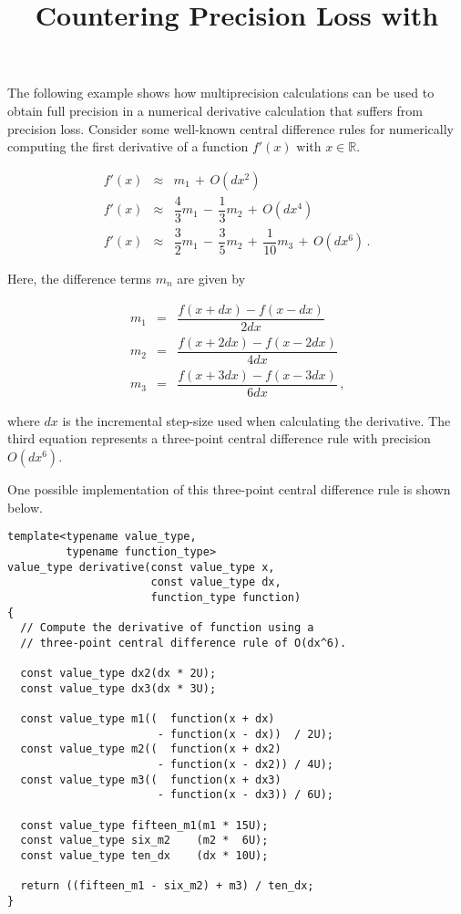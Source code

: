 \documentclass{article}[10pt]
\def\codedefault {\ttfamily}
\begin{document}
\title{Countering Precision Loss with {\codedefault{Boost.Multiprecision}}}
\maketitle

\noindent
The following example shows how multiprecision calculations
can be used to obtain full precision in a numerical derivative
calculation that suffers from precision loss.
Consider some well-known central difference rules for
numerically computing the first derivative of a function
$f'(x)$ with $x\in\mathbb{R}$.

\begin{eqnarray}
f'(x)
&\approx&
m_{1}\,+\,O(dx^{2}) \nonumber \\
f'(x)
&\approx&
\dfrac{4}{3}m_{1}\,-\,\dfrac{1}{3}m_{2}\,+\,O(dx^{4}) \nonumber \\
f'(x)
&\approx&
\dfrac{3}{2}m_{1}\,-\,\dfrac{3}{5}m_{2}\,+\,\dfrac{1}{10}m_{3}\,+\,O(dx^{6})
\,{\text{.}}
\end{eqnarray}

\noindent
Here, the difference terms $m_{n}$ are given by

\begin{eqnarray}
m_{1}
&=&
\dfrac{f\left(x+dx\right)-f\left(x-dx\right)}{2dx} \nonumber \\
m_{2}
&=&
\dfrac{f\left(x+2dx\right)-f\left(x-2dx\right)}{4dx} \nonumber \\
m_{3}
&=&
\dfrac{f\left(x+3dx\right)-f\left(x-3dx\right)}{6dx}
\,{\text{,}}
\end{eqnarray}

\noindent
where $dx$ is the incremental step-size used when calculating
the derivative. The third equation represents a three-point
central difference rule with precision $O(dx^6)$.

One possible implementation of this three-point
central difference rule is shown below.

\begin{lstlisting}
template<typename value_type,
         typename function_type>
value_type derivative(const value_type x,
                      const value_type dx,
                      function_type function)
{
  // Compute the derivative of function using a
  // three-point central difference rule of O(dx^6).

  const value_type dx2(dx * 2U);
  const value_type dx3(dx * 3U);

  const value_type m1((  function(x + dx)
                       - function(x - dx))  / 2U);
  const value_type m2((  function(x + dx2)
                       - function(x - dx2)) / 4U);
  const value_type m3((  function(x + dx3)
                       - function(x - dx3)) / 6U);

  const value_type fifteen_m1(m1 * 15U);
  const value_type six_m2    (m2 *  6U);
  const value_type ten_dx    (dx * 10U);

  return ((fifteen_m1 - six_m2) + m3) / ten_dx;
}
\end{lstlisting}
\end{document}
